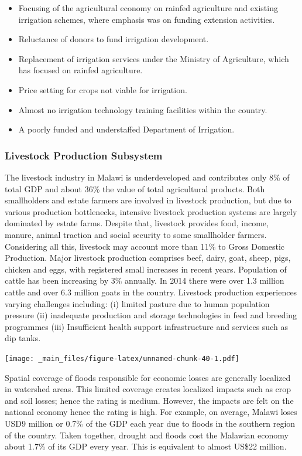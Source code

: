 \documentclass[
]{book}
\providecommand{\tightlist}{%
  \setlength{\itemsep}{0pt}\setlength{\parskip}{0pt}}
\begin{document}
\begin{itemize}
\tightlist
\item
  Focusing of the agricultural economy on rainfed agriculture and existing irrigation schemes, where emphasis was on funding extension activities.
\item
  Reluctance of donors to fund irrigation development.
\item
  Replacement of irrigation services under the Ministry of Agriculture, which has focused on rainfed agriculture.
\item
  Price setting for crops not viable for irrigation.
\item
  Almost no irrigation technology training facilities within the country.
\item
  A poorly funded and understaffed Department of Irrigation.
\end{itemize}

\hypertarget{livestock-production-subsystem}{%
\subsubsection{Livestock Production Subsystem}\label{livestock-production-subsystem}}

The livestock industry in Malawi is underdeveloped and contributes only 8\% of total GDP and about 36\% the value of total agricultural products. Both smallholders and estate farmers are involved in livestock production, but due to various production bottlenecks, intensive livestock production systems are largely dominated by estate farms. Despite that, livestock provides food, income, manure, animal traction and social security to some smallholder farmers. Considering all this, livestock may account more than 11\% to Gross Domestic Production. Major livestock production comprises beef, dairy, goat, sheep, pigs, chicken and eggs, with registered small increases in recent years. Population of cattle has been increasing by 3\% annually. In 2014 there were over 1.3 million cattle and over 6.3 million goats in the country. Livestock production experiences varying challenges including: (i) limited pasture due to human population pressure (ii) inadequate production and storage technologies in feed and breeding programmes (iii) Insufficient health support infrastructure and services such as dip tanks.

\texttt{[image: \_main\_files/figure-latex/unnamed-chunk-40-1.pdf]}

Spatial coverage of floods responsible for economic losses are generally localized in watershed areas. This limited coverage creates localized impacts such as crop and soil losses; hence the rating is medium. However, the impacts are felt on the national economy hence the rating is high. For example, on average, Malawi loses USD9 million or 0.7\% of the GDP each year due to floods in the southern region of the country. Taken together, drought and floods cost the Malawian economy about 1.7\% of its GDP every year. This is equivalent to almost US\$22 million.
\end{document}
